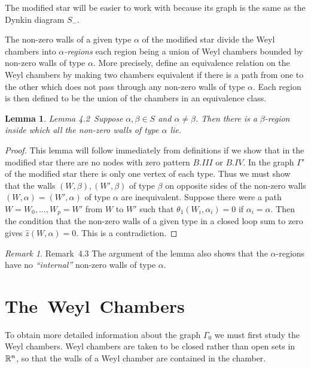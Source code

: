 \documentclass{memo-l}
\newtheorem{lemma}[theorem]{Lemma}
\theoremstyle{definition}
\theoremstyle{remark}
\newtheorem{remark}[theorem]{Remark}
\numberwithin{section}{chapter}
\numberwithin{equation}{chapter}
\begin{document}
The modified star will be easier to work with because its graph is the same
as the Dynkin diagram $S_{-}$.
 

   The non-zero walls of a given type ${\alpha}$ of the modified star
divide the Weyl chambers into {\it $\alpha$-regions} each region being a
union of Weyl chambers bounded by non-zero walls of type ${\alpha}$.  More
precisely, define an equivalence relation on the Weyl chambers by making
two chambers equivalent if there is a path from one to the other which does
not pass through any non-zero walls of type ${\alpha}$.  Each region is
then defined to be the union of the chambers in an equivalence class.

\medskip

\begin{lemma}{Lemma 4.2}\ Suppose ${\alpha},{\beta}  \in  S$ and
${\alpha}\ne {\beta}$.  Then there is a ${\beta}$-region inside which all
the non-zero walls of type ${\alpha}$ lie.
\end{lemma}

\begin{proof}   This lemma will follow immediately from
definitions if we show that in the modified star there are no nodes with
zero pattern $B.III$ or $B.IV$.  In the graph ${\Gamma}'$ of the modified
star there is only one vertex of each type.  Thus we must show that the
walls $(W,{\beta}), (W',{\beta})$ of type ${\beta}$ on opposite sides of
the non-zero walls $(W,{\alpha}) = (W',{\alpha})$ of type ${\alpha}$ are
inequivalent.  Suppose there were a path $W = W_{0},\ldots ,W_{p} = W'$ from
$W$ to $W'$ such that ${\theta}_{1}(W_{i},{\alpha}_{i}) = 0$ if
${\alpha}_{i} = {\alpha}$.  Then the condition that the non-zero walls of a
given type in a closed loop sum to zero gives $\hat z(W,{\alpha}) = 0$.
This is a contradiction.
\end{proof} 


\begin{remark}{Remark\ 4.3} The argument of the lemma also shows that the
${\alpha}$-regions have no {\it ``internal''} non-zero walls of type ${\alpha}$.
\end{remark}




\section{The\ Weyl\ Chambers}

   To obtain more detailed information about the graph ${\Gamma}_{0}$ we
must first study the Weyl chambers.  Weyl chambers are taken to be closed
rather than open sets in ${\Bbb R}^{n}$, so that the walls of a Weyl
chamber are contained in the chamber.
\end{document}
